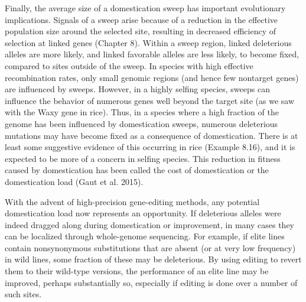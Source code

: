 \documentclass{article}
\begin{document}
Finally, the average size of a domestication sweep has important evolutionary implications. Signals of a sweep arise because of a reduction in the effective population size around the selected site, resulting in decreased efficiency of selection at linked genes (Chapter 8). Within a sweep region, linked deleterious alleles are more likely, and linked favorable alleles are less likely, to become fixed, compared to sites outside of the sweep. In species with high effective recombination rates, only small genomic regions (and hence few nontarget genes) are influenced by sweeps. However, in a highly selfing species, sweeps can influence the behavior of numerous genes well beyond the target site (as we saw with the Waxy gene in rice). Thus, in a species where a high fraction of the genome has been influenced by domestication sweeps, numerous deleterious mutations may have become fixed as a consequence of domestication. There is at least some suggestive evidence of this occurring in rice (Example 8.16), and it is expected to be more of a concern in selfing species. This reduction in fitness caused by domestication has been called the cost of domestication or the domestication load (Gaut et al. 2015).

With the advent of high-precision gene-editing methods, any potential domestication load now represents an opportunity. If deleterious alleles were indeed dragged along during domestication or improvement, in many cases they can be localized through whole-genome sequencing. For example, if elite lines contain nonsynonymous substitutions that are absent (or at very low frequency) in wild lines, some fraction of these may be deleterious. By using editing to revert them to their wild-type versions, the performance of an elite line may be improved, perhaps substantially so, especially if editing is done over a number of such sites.
\end{document}
